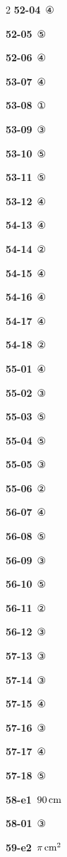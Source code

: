\documentclass[10pt,a4paper]{article}
\begin{document}
\begin{multicols}{2}
\noindent\textbf{52-04}\ ④\par
\noindent\textbf{52-05}\ ⑤\par
\noindent\textbf{52-06}\ ④\par
\noindent\textbf{53-07}\ ④\par
\noindent\textbf{53-08}\ ①\par
\noindent\textbf{53-09}\ ③\par
\noindent\textbf{53-10}\ ⑤\par
\noindent\textbf{53-11}\ ⑤\par
\noindent\textbf{53-12}\ ④\par
\noindent\textbf{54-13}\ ④\par
\noindent\textbf{54-14}\ ②\par
\noindent\textbf{54-15}\ ④\par
\noindent\textbf{54-16}\ ④\par
\noindent\textbf{54-17}\ ④\par
\noindent\textbf{54-18}\ ②\par
\noindent\textbf{55-01}\ ④\par
\noindent\textbf{55-02}\ ③\par
\noindent\textbf{55-03}\ ⑤\par
\noindent\textbf{55-04}\ ⑤\par
\noindent\textbf{55-05}\ ③\par
\noindent\textbf{55-06}\ ②\par
\noindent\textbf{56-07}\ ④\par
\noindent\textbf{56-08}\ ⑤\par
\noindent\textbf{56-09}\ ③\par
\noindent\textbf{56-10}\ ⑤\par
\noindent\textbf{56-11}\ ②\par
\noindent\textbf{56-12}\ ③\par
\noindent\textbf{57-13}\ ③\par
\noindent\textbf{57-14}\ ③\par
\noindent\textbf{57-15}\ ④\par
\noindent\textbf{57-16}\ ③\par
\noindent\textbf{57-17}\ ④\par
\noindent\textbf{57-18}\ ⑤\par
\noindent\textbf{58-e1}\ $90\mkern3mu \mathrm{cm}$\par
\noindent\textbf{58-01}\ ③\par
\noindent\textbf{59-e2}\ $\pi\mkern3mu \mathrm{cm}^2$\par

\end{multicols}
\end{document}
